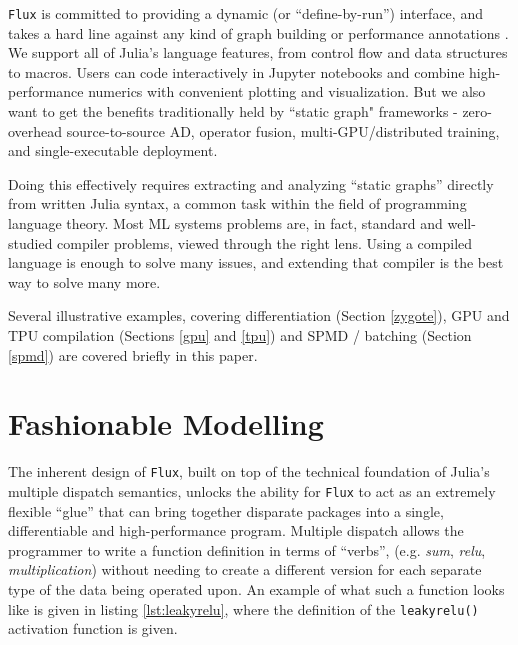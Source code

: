 \documentclass{juliacon}
\begin{document}
\texttt{Flux} is committed to providing a dynamic (or ``define-by-run'') interface, and takes a hard line against any kind of graph building or performance annotations \cite{PyTorch1}. We support all of Julia's language features, from control flow and data structures to macros. Users can code interactively in Jupyter notebooks and combine high-performance numerics with convenient plotting and visualization. But we also want to get the benefits traditionally held by ``static graph" frameworks - zero-overhead source-to-source AD, operator fusion, multi-GPU/distributed training, and single-executable deployment.

Doing this effectively requires extracting and analyzing ``static graphs'' directly from written Julia syntax, a common task within the field of programming language theory. Most ML systems problems are, in fact, standard and well-studied compiler problems, viewed through the right lens. Using a compiled language is enough to solve many issues, and extending that compiler is the best way to solve many more.

Several illustrative examples, covering differentiation (Section \ref{zygote}), GPU and TPU compilation (Sections \ref{gpu} and \ref{tpu}) and SPMD / batching (Section \ref{spmd}) are covered briefly in this paper.

\section{Fashionable Modelling}

The inherent design of \texttt{Flux}, built on top of the technical foundation of Julia's multiple dispatch semantics, unlocks the ability for \texttt{Flux} to act as an extremely flexible ``glue'' that can bring together disparate packages into a single, differentiable and high-performance program.  Multiple dispatch allows the programmer to write a function definition in terms of ``verbs'', (e.g. \textit{sum}, \textit{relu}, \textit{multiplication}) without needing to create a different version for each separate type of the data being operated upon.  An example of what such a function looks like is given in listing \ref{lst:leakyrelu}, where the definition of the \texttt{leakyrelu()} activation function is given.
\end{document}
